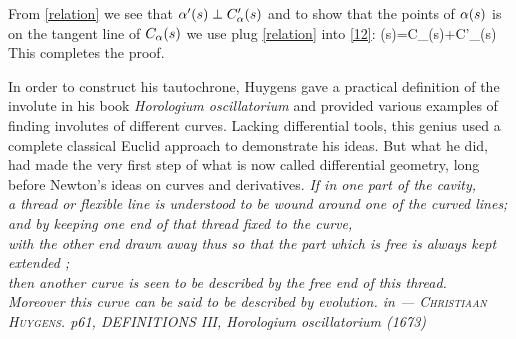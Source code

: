 From \eqref{relation} we see that $\alpha'(s)\perp C'_\alpha(s)$ and to show that
the points of $\alpha(s)$ is on the tangent line of $C_{\alpha}(s)$ we use plug \eqref{relation} into \eqref{12}:
\eq
{
\a(s)=C_{\a}(s)+C'_{\a}(s)
}
This completes the proof.

In order to construct his tautochrone, Huygens gave a practical definition of 
the involute in his book {\it Horologium oscillatorium} and provided various 
examples of finding involutes of different curves. Lacking differential tools, this genius used a complete 
classical Euclid approach to demonstrate his ideas. But what he did, had
made the very first step of what is now called differential geometry, long before
Newton's ideas on curves and derivatives.
\vfill
{\flushright
	{\sffamily\slshape
	If in one part of the cavity,\\
	 a thread or flexible line is understood to be wound around one of the curved lines;\\
	  and by keeping one end of that thread fixed to the curve,\\
	   with the other end drawn away thus so that the part which is free is always kept extended ;\\
	    then another curve is seen to be described by the free end of this thread. \\
	    Moreover this curve can be said to be described by evolution.
		  in
		{\hfill\sffamily\upshape --- 
\textsc{Christiaan Huygens}. p61, DEFINITIONS III,  \it Horologium oscillatorium \rm (1673)}
	}	
}